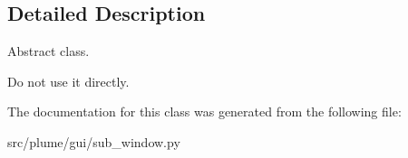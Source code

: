 \subsection{Detailed Description}
Abstract class. 

Do not use it directly. 

The documentation for this class was generated from the following file\+:\begin{DoxyCompactItemize}
\item 
src/plume/gui/sub\+\_\+window.\+py\end{DoxyCompactItemize}
